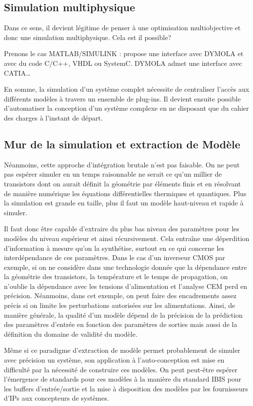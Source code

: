 \documentclass[11pt]{article}
\begin{document}
\subsection{Simulation multiphysique}

Dans ce sens, il devient légitime de penser à une optimisation multiobjective et  donc une simulation multiphysique. Cela est il possible?

Prenons le cas MATLAB/SIMULINK : propose une interface avec DYMOLA et avec du code C/C++, VHDL ou SystemC. DYMOLA admet une interface avec CATIA\ldots

En somme, la simulation d'un système complet nécessite de centraliser l'accès aux différents modèles à travers un ensemble de plug-ins. Il devient ensuite possible d'automatiser la conception d'un système complexe en ne disposant que du cahier des charges à l'instant de départ.

\subsection{Mur de la simulation et extraction de Modèle}

Néanmoins, cette approche d'intégration brutale n'est pas faisable. On ne peut pas espérer simuler en un temps raisonnable ne serait ce qu'un millier de transistors dont on aurait définit la géométrie par éléments finis et en résolvant de manière numérique les équations différentielles thermiques et quantiques. Plus la simulation est grande en taille, plus il faut un modèle haut-niveau et rapide à simuler.

Il faut donc être capable d'extraire du plus bas niveau des paramètres pour les modèles du niveau supérieur et ainsi récursivement. Cela entraîne une déperdition d'information à mesure qu'on la synthétise, surtout en ce qui concerne les interdépendance de ces paramètres. Dans le cas d'un inverseur CMOS par exemple, si on ne considère dans une technologie donnée que la dépendance entre la géométrie des transistors, la température et le temps de propagation, on n'oublie la dépendance avec les tensions d'alimentation et l'analyse CEM perd en précision. Néanmoins, dans cet exemple, on peut faire des encadrements assez précis si on limite les perturbations autorisées sur les alimentations. Ainsi, de manière générale, la qualité d'un modèle dépend de la précision de la prédiction des paramètres d'entrée en fonction des paramètres de sorties mais aussi de la définition du domaine de validité du modèle.

Même si ce paradigme d'extraction de modèle permet probablement de simuler avec précision un système, son application à l'auto-conception est mise en difficulté par la nécessité de construire ces modèles. On peut peut-être espérer l'émergence de standards pour ces modèles à la manière du standard IBIS pour les buffers d'entrée/sortie et la mise à disposition des modèles par les fournisseurs d'IPs aux concepteurs de systèmes.
\end{document}
